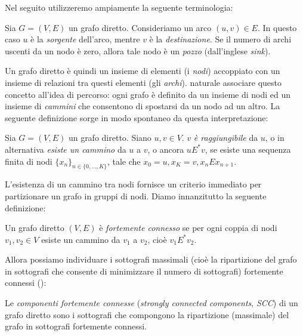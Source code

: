 Nel seguito utilizzeremo ampiamente la seguente terminologia:
\begin{definition}
    Sia $G = (V,E)$ un grafo diretto. Consideriamo un arco $(u,v) \in E$. In questo caso $u$ è la \emph{sorgente} dell'arco, mentre $v$ è la \emph{destinazione}. Se il numero di archi uscenti da un nodo è zero, allora tale nodo  è un \emph{pozzo} (dall'inglese \emph{sink}).
\end{definition}
Un grafo diretto è quindi un insieme di elementi (i \emph{nodi}) accoppiato con un insieme di relazioni tra questi elementi (gli \emph{archi}). \accente naturale associare questo concetto all'idea di percorso: ogni grafo è definito da un insieme di nodi ed un insieme di \emph{cammini} che consentono di spostarsi da un nodo ad un altro. La seguente definizione sorge in modo spontaneo da questa interpretazione:
\begin{definition}
    Sia $G = (V, E)$ un grafo diretto. Siano $u,v \in V$. $v$ \emph{è raggiungibile} da $u$, o in alternativa \emph{esiste un cammino} da $u$ a $v$, o ancora $u E^{*} v$, se esiste una sequenza finita di nodi $\displaystyle \{x_n\}_{n \in \{0,\dots,K\}}$, tale che $x_0 = u, x_K = v, x_n E x_{n+1}$.
\end{definition}
L'esistenza di un cammino tra nodi fornisce un criterio immediato per partizionare un grafo in gruppi di nodi. Diamo innanzitutto la seguente definizione:
\begin{definition}
    Un grafo diretto $(V,E)$ è \emph{fortemente connesso} se per ogni coppia di nodi $v_1, v_2 \in V$ esiste un cammino da $v_1$ a $v_2$, cioè $v_1 E^{*} v_2$.
\end{definition}
Allora possiamo individuare i sottografi massimali (cioè la ripartizione del grafo in sottografi che consente di minimizzare il numero di sottografi) fortemente connessi (\hspace*{-0.1cm}\cite[Appendice B]{clrs}):
\begin{definition}
    Le \emph{componenti fortemente connesse} (\emph{strongly connected components}, \emph{SCC}) di un grafo diretto sono i sottografi che compongono la ripartizione (massimale) del grafo in sottografi fortemente connessi.
\end{definition}
